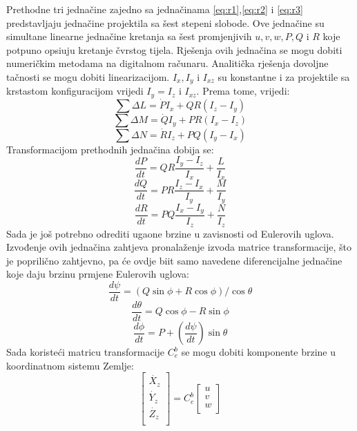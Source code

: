 Prethodne tri jednačine zajedno sa jednačinama \ref{eq:r1},\ref{eq:r2} i \ref{eq:r3} predstavljaju
jednačine projektila sa šest stepeni slobode. Ove jednačine su simultane linearne jednačine 
kretanja sa šest promjenjivih $u,v,w,P,Q$ i $R$ koje potpuno opsiuju kretanje 
čvrstog tijela. Rješenja ovih jednačina se mogu dobiti numeričkim metodama na digitalnom 
računaru. Analitička rješenja dovoljne tačnosti se mogu dobiti linearizacijom. $I_x,I_y$ i $I_{xz}$ su konstantne 
i za projektile sa krstastom konfiguracijom vrijedi $I_y=I_z$ i $I_{xz}$. Prema tome, vrijedi:
\begin{equation}
    \sum \Delta L=\dot{P}I_x+QR(I_z-I_y)
\end{equation}
\begin{equation}
    \sum \Delta M=\dot{Q}I_y+PR(I_x-I_z)
\end{equation}
\begin{equation}
    \sum \Delta N=\dot{R}I_z+PQ(I_y-I_x)
\end{equation}
Transformacijom prethodnih jednačina dobija se:
\begin{equation}
    \frac{dP}{dt}=QR\frac{I_y-I_z}{I_x}+\frac{L}{I_x}
    \label{eq:q1}
\end{equation}
\begin{equation}
    \frac{dQ}{dt}=PR\frac{I_z-I_x}{I_y}+\frac{M}{I_y}
    \label{eq:q2}
\end{equation}
\begin{equation}
    \frac{dR}{dt}=PQ\frac{I_x-I_y}{I_z}+\frac{N}{I_z}
    \label{eq:q3}
\end{equation}
Sada je još potrebno odrediti ugaone brzine u zavisnosti od Eulerovih uglova. Izvođenje ovih jednačina zahtjeva 
pronalaženje izvoda matrice transformacije, što je poprilično zahtjevno, pa će ovdje biit samo navedene 
diferencijalne jednačine koje daju brzinu prmjene Eulerovih uglova:
\begin{equation}
    \frac{d\psi}{dt}=(Q\sin\phi +R\cos\phi)/\cos\theta
    \label{eq:w1}
\end{equation}
\begin{equation}
    \frac{d\theta}{dt}=Q\cos\phi-R\sin\phi
    \label{eq:w2}
\end{equation}
\begin{equation}
    \frac{d\phi}{dt}=P+\left( \frac{d\psi}{dt} \right)\sin\theta
    \label{eq:w3}
\end{equation}
Sada koristeći matricu transformacije $C_e^b$ se mogu dobiti komponente
brzine u koordinatnom sistemu Zemlje:
\begin{equation}
    \begin{bmatrix}
        \dot{X_z}\\
        \dot{Y_z}\\   
        \dot{Z_z}\\
    \end{bmatrix}=C_e^b\begin{bmatrix}
        u\\
        v\\   
        w\\
    \end{bmatrix}
    \label{eq:q}
\end{equation}
